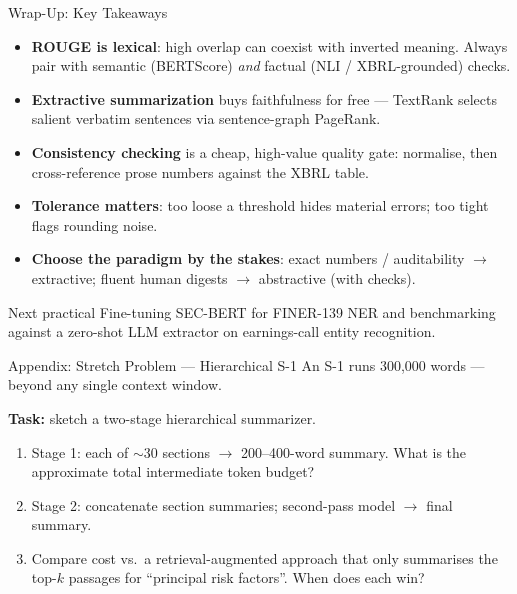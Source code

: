 \documentclass[9pt,t]{beamer}
\begin{document}
\begin{frame}{Wrap-Up: Key Takeaways}
\begin{itemize}
  \item \textbf{ROUGE is lexical}: high overlap can coexist with inverted meaning.
        Always pair with semantic (BERTScore) \emph{and} factual (NLI / XBRL-grounded) checks.
  \item \textbf{Extractive summarization} buys faithfulness for free --- TextRank
        selects salient verbatim sentences via sentence-graph PageRank.
  \item \textbf{Consistency checking} is a cheap, high-value quality gate:
        normalise, then cross-reference prose numbers against the XBRL table.
  \item \textbf{Tolerance matters}: too loose a threshold hides material errors;
        too tight flags rounding noise.
  \item \textbf{Choose the paradigm by the stakes}: exact numbers / auditability
        $\to$ extractive; fluent human digests $\to$ abstractive (with checks).
\end{itemize}
\medskip
\begin{block}{Next practical}
Fine-tuning SEC-BERT for FINER-139 NER and benchmarking against a zero-shot LLM
extractor on earnings-call entity recognition.
\end{block}
\end{frame}


\begin{frame}[noframenumbering]{Appendix: Stretch Problem --- Hierarchical S-1}
An S-1 runs 300{,}000 words --- beyond any single context window.

\medskip
\textbf{Task:} sketch a two-stage hierarchical summarizer.
\begin{enumerate}
  \item Stage 1: each of $\sim$30 sections $\to$ 200--400-word summary. What is the
        approximate total intermediate token budget?
  \item Stage 2: concatenate section summaries; second-pass model $\to$ final summary.
  \item Compare cost vs.\ a retrieval-augmented approach that only summarises the
        top-$k$ passages for ``principal risk factors''. When does each win?
\end{enumerate}
\end{frame}
\end{document}

